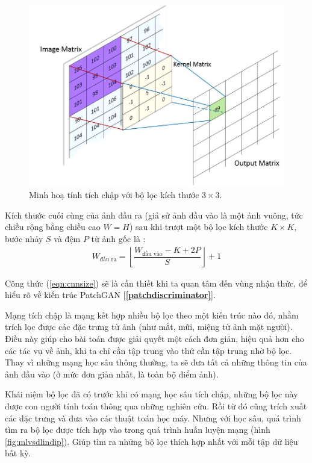 \documentclass[a4paper, 12pt]{report}
\begin{document}
\begin{figure}[!h]
\captionsetup{width=0.8\textwidth}
\centering
\includegraphics[width=15cm]{images/convinimage.jpg}
\caption{Minh hoạ tính tích chập với bộ lọc kích thước $3 \times 3$.}
\label{fig:convoperator}
\end{figure}

Kích thước cuối cùng của ảnh đầu ra (giả sử ảnh đầu vào là một ảnh vuông, tức chiều rộng bằng chiều cao $W = H$) sau khi trượt một bộ lọc kích thước $K \times K$, bước nhảy $S$ và đệm $P$ từ ảnh gốc là \cite{replycalcnnsize}:
\begin{align}
    W_{\text{đầu ra}} = \left\lfloor\dfrac{W_{\text{đầu vào}} - K + 2P}{S}\right\rfloor + 1\label{eqn:cnnsize}
\end{align}

Công thức (\ref{eqn:cnnsize}) sẽ là cần thiết khi ta quan tâm đến vùng nhận thức, để hiểu rõ về kiến trúc PatchGAN [\textbf{\ref{patchdiscriminator}}].\vspace{5pt}

Mạng tích chập là mạng kết hợp nhiều bộ lọc theo một kiến trúc nào đó, nhằm trích lọc được các đặc trưng từ ảnh (như mắt, mũi, miệng từ ảnh mặt người).
Điều này giúp cho bài toán được giải quyết một cách đơn giản, hiệu quả hơn cho các tác vụ về ảnh, khi ta chỉ cần tập trung vào thứ cần tập trung nhờ bộ lọc.
Thay vì những mạng học sâu thông thường, ta sẽ đưa tất cả những thông tin của ảnh đầu vào (ở mức đơn giản nhất, là toàn bộ điểm ảnh).\vspace{5pt}

Khái niệm bộ lọc đã có trước khi có mạng học sâu tích chập, những bộ lọc này được con người tính toán thông qua những nghiên cứu.
Rồi từ đó cũng trích xuất các đặc trưng và đưa vào các thuật toán học máy.
Nhưng với học sâu, quá trình tìm ra bộ lọc được tích hợp vào trong quá trình huấn luyện mạng (hình \ref{fig:mlvsdlindip}).
Giúp tìm ra những bộ lọc thích hợp nhất với mỗi tập dữ liệu bất kỳ.\vspace{5pt}
\end{document}
